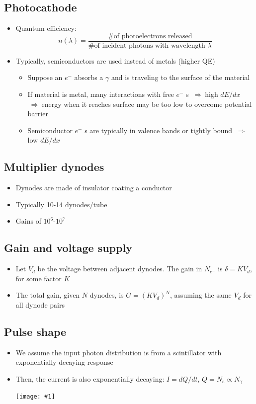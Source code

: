 \documentclass[11pt]{article}
\newcommand{\el}{\ensuremath{e^{-}}\xspace}
\newcommand{\thus}{$~\Rightarrow~$}
\newcommand{\embedimgw}[2]{\begin{center}\texttt{[image: \#1]}\end{center}}
\begin{document}
\subsection{Photocathode}
\begin{itemize}
  \item Quantum efficiency:
  \begin{equation}
    n(\lambda) = \frac{\text{\# of photoelectrons released}}{\text{\# of incident photons with wavelength $\lambda$}}
  \end{equation}
  \item Typically, semiconductors are used instead of metals (higher QE)
  \begin{itemize}
    \item Suppose an \el absorbs a $\gamma$ and is traveling to the surface of the material
    \item If material is metal, many interactions with free \el s \thus high $dE/dx$ \thus energy when it reaches surface may be too low to overcome potential barrier
    \item Semiconductor \el s are typically in valence bands or tightly bound \thus low $dE/dx$
  \end{itemize}
\end{itemize}

\subsection{Multiplier dynodes}
\begin{itemize}
  \item Dynodes are made of insulator coating a conductor
  \item Typically 10-14 dynodes/tube
  \item Gains of $10^6$-$10^7$
\end{itemize}

\subsection{Gain and voltage supply}
\begin{itemize}
  \item Let $V_d$ be the voltage between adjacent dynodes. The gain in $N_\el$ is $\delta = K V_d$, for some factor $K$
  \item The total gain, given $N$ dynodes, is $G = (KV_d)^N$, assuming the same $V_d$ for all dynode pairs
\end{itemize}

\subsection{Pulse shape}
\begin{itemize}
  \item We assume the input photon distribution is from a scintillator with exponentially decaying response
  \item Then, the current is also exponentially decaying: $I = dQ/dt$, $Q = N_e\propto N_\gamma$
  \embedimgw{figs/pmt_pulse.png}{.7}
\end{itemize}
\end{document}
